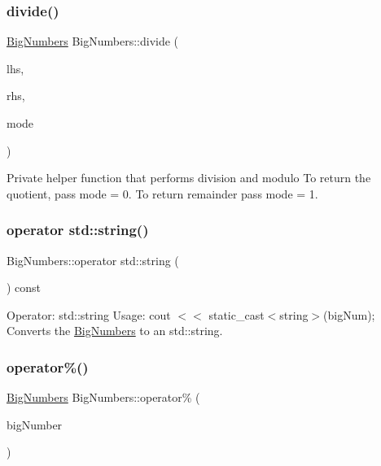 \subsubsection{\texorpdfstring{divide()}{divide()}}
{\footnotesize\ttfamily \mbox{\hyperlink{class_big_numbers}{Big\+Numbers}} Big\+Numbers\+::divide (\begin{DoxyParamCaption}\item[{\mbox{\hyperlink{class_big_numbers}{Big\+Numbers}}}]{lhs,  }\item[{\mbox{\hyperlink{class_big_numbers}{Big\+Numbers}}}]{rhs,  }\item[{int}]{mode }\end{DoxyParamCaption})\hspace{0.3cm}{\ttfamily [private]}}

Private helper function that performs division and modulo To return the quotient, pass mode = 0. To return remainder pass mode = 1. \mbox{\label{class_big_numbers_af879df797b67fcbe442746d0532529ab}} 
\subsubsection{\texorpdfstring{operator std\+::string()}{operator std::string()}}
{\footnotesize\ttfamily Big\+Numbers\+::operator std\+::string (\begin{DoxyParamCaption}{ }\end{DoxyParamCaption}) const}

Operator\+: std\+::string Usage\+: cout $<$$<$ static\+\_\+cast$<$string$>$(big\+Num); Converts the \mbox{\hyperlink{class_big_numbers}{Big\+Numbers}} to an std\+::string. \mbox{\label{class_big_numbers_a15bc2fa1946a85e8cd745a26e460d51e}} 
\subsubsection{\texorpdfstring{operator\%()}{operator\%()}}
{\footnotesize\ttfamily \mbox{\hyperlink{class_big_numbers}{Big\+Numbers}} Big\+Numbers\+::operator\% (\begin{DoxyParamCaption}\item[{const \mbox{\hyperlink{class_big_numbers}{Big\+Numbers}} \&}]{big\+Number }\end{DoxyParamCaption})}

